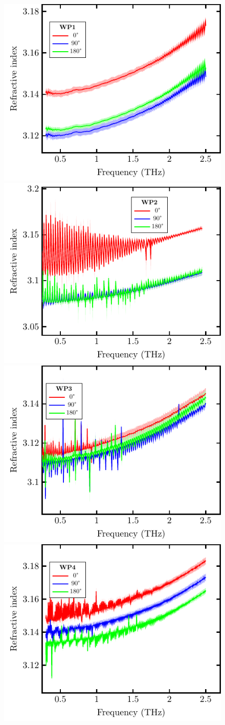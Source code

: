 \begin{figure}[H]
\centering
\subcaptionbox{\label{fig:ceramic_WP1}}
    {\hspace*{-2em}\includegraphics[width=0.45\linewidth]{images/appendix/plots/real/WP1.pdf}}
\qquad
\subcaptionbox{\label{fig:ceramic_WP2}}
    {\hspace*{-2em}\includegraphics[width=0.45\linewidth]{images/appendix/plots/real/WP2.pdf}}
\subcaptionbox{\label{fig:ceramic_WP3}}
    {\hspace*{-2em}\includegraphics[width=0.45\linewidth]{images/appendix/plots/real/WP3.pdf}}
\qquad
\subcaptionbox{\label{fig:ceramic_WP4}}
    {\hspace*{-2em}\includegraphics[width=0.45\linewidth]{images/appendix/plots/real/WP4.pdf}}

\end{figure}

